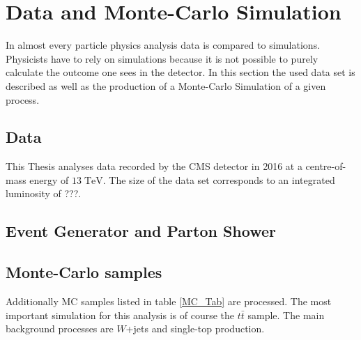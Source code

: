 \chapter{Data and Monte-Carlo Simulation}
	In almost every particle physics analysis data is compared to simulations. Physicists have to rely on simulations because it is not possible to purely calculate the outcome one sees in the detector. In this section the used data set is described as well as the production of a Monte-Carlo Simulation of a given process.
	\section{Data}
	This Thesis analyses data recorded by the CMS detector in 2016 at a centre-of-mass energy of $13\;\text{TeV}$. The size of the data set corresponds to an integrated luminosity of ???. 
	\section{Event Generator and Parton Shower}
	\section{Monte-Carlo samples}
	Additionally MC samples listed in table \ref{MC_Tab} are processed. The most important simulation for this analysis is of course the $t\bar{t}$ sample. The main background processes are $W$+jets and single-top production.
	
